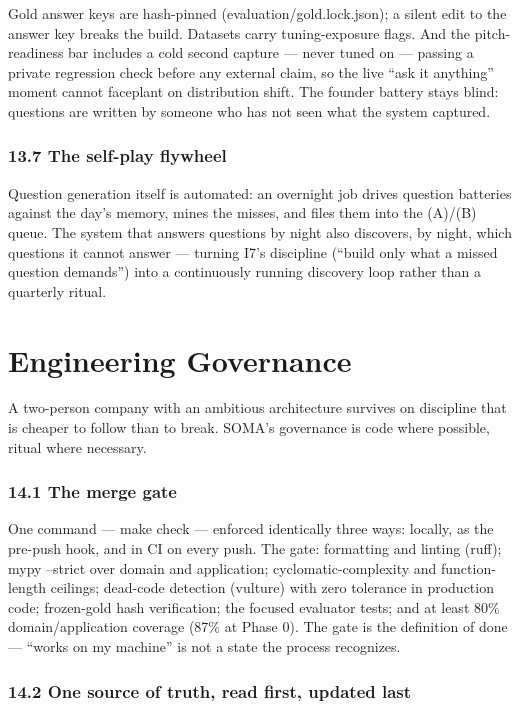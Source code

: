 Gold answer keys are hash-pinned (evaluation/gold.lock.json); a silent edit to the answer key breaks the build. Datasets carry tuning-exposure flags. And the pitch-readiness bar includes a cold second capture --- never tuned on --- passing a private regression check before any external claim, so the live ``ask it anything'' moment cannot faceplant on distribution shift. The founder battery stays blind: questions are written by someone who has not seen what the system captured.

\subsection{13.7 The self-play flywheel}\label{the-self-play-flywheel}

Question generation itself is automated: an overnight job drives question batteries against the day's memory, mines the misses, and files them into the (A)/(B) queue. The system that answers questions by night also discovers, by night, which questions it cannot answer --- turning I7's discipline (``build only what a missed question demands'') into a continuously running discovery loop rather than a quarterly ritual.

\chapter{Engineering Governance}\label{engineering-governance}

A two-person company with an ambitious architecture survives on discipline that is cheaper to follow than to break. SOMA's governance is code where possible, ritual where necessary.

\subsection{14.1 The merge gate}\label{the-merge-gate}

One command --- make check --- enforced identically three ways: locally, as the pre-push hook, and in CI on every push. The gate: formatting and linting (ruff); mypy --strict over domain and application; cyclomatic-complexity and function-length ceilings; dead-code detection (vulture) with zero tolerance in production code; frozen-gold hash verification; the focused evaluator tests; and at least 80\% domain/application coverage (87\% at Phase 0). The gate is the definition of done --- ``works on my machine'' is not a state the process recognizes.

\subsection{14.2 One source of truth, read first, updated last}\label{one-source-of-truth-read-first-updated-last}

